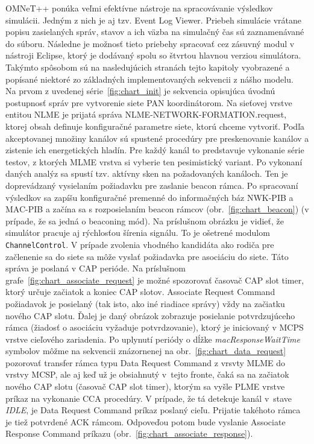 \indent OMNeT++ ponúka veľmi efektívne nástroje na spracovávanie výsledkov simulácii. Jedným z nich je aj tzv. Event Log Viewer. Priebeh simulácie vrátane popisu zasielaných správ, stavov a ich väzba na simulačný čas sú zaznamenávané do súboru. Následne je možnosť tieto priebehy spracovať cez zásuvný modul v nástroji Eclipse, ktorý je dodávaný spolu so štvrtou hlavnou verziou simulátora. Takýmto spôsobom sú na nasledujúcich stranách tejto kapitoly vyobrazené a popísané niektoré zo základných implementovaných sekvencii z nášho modelu.\\
\indent Na prvom z uvedenej série~\ref{fig:chart_init} je sekvencia opisujúca úvodnú postupnosť správ pre vytvorenie siete PAN koordinátorom. Na sieťovej vrstve entitou {NLME je prijatá správa NLME-NETWORK-FORMATION.request, ktorej obsah definuje konfiguračné parametre siete, ktorú chceme vytvoriť. Podľa akceptovanej množiny kanálov sú spustené procedúry pre preskenovanie kanálov a zistenie ich energetických hladín. Pre každý kanál to predstavuje vykonanie série testov, z ktorých MLME vrstva si vyberie ten pesimistický variant. Po vykonaní daných analýz sa spustí tzv. aktívny sken na požadovaných kanáloch. Ten je doprevádzaný vysielaním požiadavku pre zaslanie beacon rámca. Po spracovaní výsledkov sa zapíšu konfiguračné premenné do informačných báz NWK-PIB a MAC-PIB a začína sa s rozposielaním beacon rámcov (obr.~\ref{fig:chart_beacon}) (v prípade, že sa jedná o beaconing mód). Na príslušnom obrázku je vidieť, že simulátor pracuje aj rýchlosťou šírenia signálu. To je ošetrené modulom \texttt{ChannelControl}. V prípade zvolenia vhodného kandidáta ako rodiča pre začlenenie sa do siete sa môže vyslať požiadavka pre asociáciu do siete. Táto správa je poslaná v CAP perióde. Na príslušnom grafe~\ref{fig:chart_associate_request} je možné spozorovať časovač CAP slot timer, ktorý určuje začiatok a koniec CAP slotov. Asso\-ciate Request Command požiadavok je posielaný (tak isto, ako iné riadiace správy) vždy na začiatku nového CAP slotu. Ďalej je daný obrázok zobrazuje posielanie potvrdzujúceho rámca (žiadosť o asociáciu vyžaduje potvrdzovanie), ktorý je iniciovaný v MCPS vrstve cieľového zariadenia. Po uplynutí periódy o dĺžke \textit{macResponseWaitTime} symbolov môžme na sekvencii znázornenej na obr.~\ref{fig:chart_data_request} pozorovať transfer rámca typu Data Request Command z vrsvty MLME do vrstvy MCSP, ale aj keď už je obsiahnutý v~tejto fronte, čaká sa na začiatok nového CAP slotu (časovač CAP slot timer), ktorým sa vyšle PLME vrstve príkaz na vykonanie CCA procedúry. V prípade, že tá detekuje kanál v~stave \textit{IDLE}, je Data Request Command príkaz poslaný cieľu. Prijatie takéhoto rámca je tiež potvrdené ACK rámcom. Odpoveďou potom bude vyslanie Associate Response Command príkazu (obr.~\ref{fig:chart_associate_response}).\\
}
